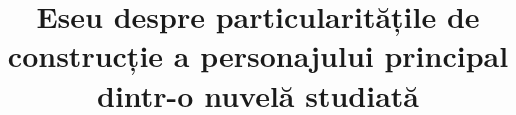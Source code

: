 

\title{Eseu despre particularitățile de construcție a personajului principal dintr-o nuvelă studiată}


 \maketitle %
 


